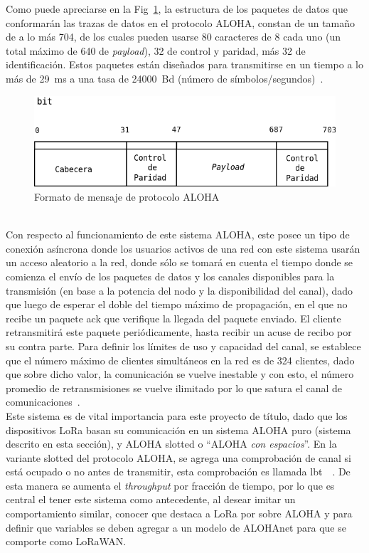 \begin{justify}
Como puede apreciarse en la Fig~\ref{aloha:msg}, la estructura de los paquetes de datos que conformarán las trazas de datos en el protocolo ALOHA, constan de un tamaño de a lo más \SI{704}{\bit}, de los cuales pueden usarse \num{80} caracteres de \SI{8}{\bit} cada uno (un total máximo de \SI{640}{\bit} de \textit{payload}), \SI{32}{\bit} de control y paridad, más \SI{32}{\bit} de identificación. Estos paquetes están diseñados para transmitirse en un tiempo a lo más de \SI{29}{\milli\second} a una tasa de \SI{24000}{Bd} (número de símbolos/segundos)~\cite{NORMAN}.\\
\begin{figure}[!ht]
\centering
\includegraphics[scale=0.5]{images/alohamsg.png}
\caption{Formato de mensaje de protocolo ALOHA}
\label{aloha:msg}
\end{figure}\\
Con respecto al funcionamiento de este sistema ALOHA, este posee un tipo de conexión asíncrona donde los usuarios activos de una red con este sistema usarán un acceso aleatorio a la red, donde sólo se tomará en cuenta el tiempo donde se comienza el envío de los paquetes de datos y los canales disponibles para la transmisión (en base a la potencia del nodo y la disponibilidad del canal), dado que luego de esperar el doble del tiempo máximo de propagación, en el que  no recibe un paquete \gls{ack} que verifique la llegada del paquete enviado. El cliente retransmitirá este paquete periódicamente, hasta recibir un acuse de recibo por su contra parte. Para definir los límites de uso y capacidad del canal, se establece que el número máximo de clientes simultáneos en la red es de \num{324} clientes, dado que sobre dicho valor, la comunicación se vuelve inestable y con esto, el número promedio de retransmisiones se vuelve ilimitado por lo que satura el canal de comunicaciones~\cite{NORMAN}.\\
Este sistema es de vital importancia para este proyecto de título, dado que los dispositivos LoRa basan su comunicación en un sistema ALOHA puro (sistema descrito en esta sección), y ALOHA slotted o ``ALOHA \textit{con espacios}''. En la variante slotted del protocolo ALOHA, se agrega una comprobación de canal si está ocupado o no antes de transmitir, esta comprobación es llamada \gls{lbt}~\cite{Sornin}~\cite{Sornin2}. De esta manera se aumenta el \textit{throughput} por fracción de tiempo, por lo que es central el tener este sistema como antecedente, al desear imitar un comportamiento similar, conocer que destaca a LoRa por sobre ALOHA y para definir que variables se deben agregar a un modelo de ALOHAnet para que se comporte como LoRaWAN.

\end{justify}
